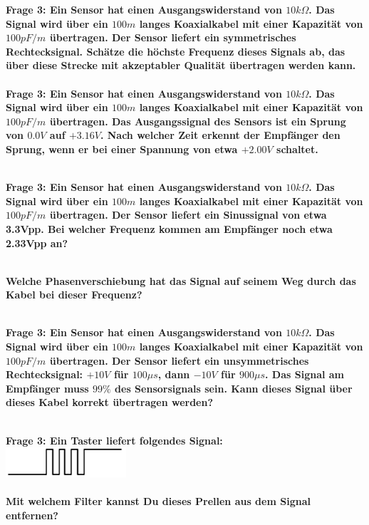 \documentclass[11pt,a4paper]{scrartcl}
\begin{document}
\newpage
\textbf{Frage 3: Ein Sensor hat einen Ausgangswiderstand von $10k\Omega$. Das Signal wird über ein $100m$ langes Koaxialkabel mit einer Kapazität von $100pF/m$ übertragen. Der Sensor liefert ein symmetrisches Rechtecksignal. Schätze die höchste Frequenz dieses Signals ab, das über diese Strecke mit
akzeptabler Qualität übertragen werden kann.}\\

\\

\textbf{Frage 3: Ein Sensor hat einen Ausgangswiderstand von $10k\Omega$. Das Signal wird über ein $100m$ langes Koaxialkabel mit einer Kapazität von $100pF/m$ übertragen. Das Ausgangssignal des Sensors ist ein Sprung von $0.0V$ auf $+3.16V$. Nach welcher Zeit erkennt der Empfänger den Sprung, wenn er bei einer
Spannung von etwa $+2.00V$ schaltet.}

\\

\textbf{Frage 3: Ein Sensor hat einen Ausgangswiderstand von $10k\Omega$. Das Signal wird über ein $100m$ langes Koaxialkabel mit einer Kapazität von $100pF/m$ übertragen. Der Sensor liefert ein Sinussignal von etwa 3.3Vpp. Bei welcher Frequenz kommen am Empfänger noch etwa 2.33Vpp an?}

\\

\textbf{Welche Phasenverschiebung hat das Signal auf seinem Weg durch das Kabel
bei dieser Frequenz?}

\\

\textbf{Frage 3: Ein Sensor hat einen Ausgangswiderstand von $10k\Omega$. Das Signal wird über ein $100m$ langes Koaxialkabel mit einer Kapazität von $100pF/m$ übertragen. Der Sensor liefert ein unsymmetrisches Rechtecksignal: $+10V$ für $100\mu s$, dann $-10V$ für $900\mu s$. Das Signal am Empfänger muss $99\%$ des Sensorsignals sein. Kann dieses Signal über dieses Kabel korrekt übertragen werden?}

\\

\textbf{Frage 3: Ein Taster liefert folgendes Signal:}\\
\includegraphics{Taster.png}\\
\\

\textbf{Mit welchem Filter kannst Du dieses Prellen aus dem Signal entfernen?}
\end{document}
